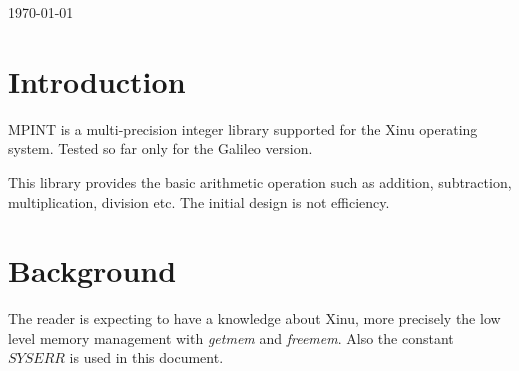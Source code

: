 \documentclass[10pt,a4paper]{article}
\begin{document}
\begin{titlepage}
    
    
    {\large \today}\\[1cm] %
    
    
    
    
  \end{titlepage}
  \restoregeometry
  
  
  \tableofcontents
  \newpage
  
  \section{Introduction}
  
  MPINT is a multi-precision integer library supported for the Xinu operating system. Tested so far only for the Galileo version.
  
  This library provides the basic arithmetic operation such as addition, subtraction, multiplication, division etc. The initial design is not efficiency.
  
  \section{Background}
  
  The reader is expecting to have a knowledge about Xinu, more precisely the low level memory management with \textit{getmem} and \textit{freemem}. Also
  the constant $SYSERR$ is used in this document.
  
\end{document}

